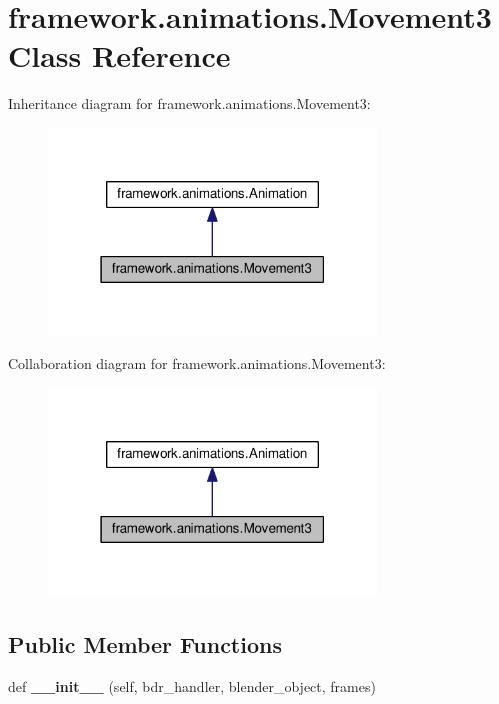 \hypertarget{classframework_1_1animations_1_1Movement3}{}\section{framework.\+animations.\+Movement3 Class Reference}
\label{classframework_1_1animations_1_1Movement3}


Inheritance diagram for framework.\+animations.\+Movement3\+:
\nopagebreak
\begin{figure}[H]
\begin{center}
\leavevmode
\includegraphics[width=247pt]{classframework_1_1animations_1_1Movement3__inherit__graph}
\end{center}
\end{figure}


Collaboration diagram for framework.\+animations.\+Movement3\+:
\nopagebreak
\begin{figure}[H]
\begin{center}
\leavevmode
\includegraphics[width=247pt]{classframework_1_1animations_1_1Movement3__coll__graph}
\end{center}
\end{figure}
\subsection*{Public Member Functions}
\begin{DoxyCompactItemize}
\item 
def {\bfseries \+\_\+\+\_\+init\+\_\+\+\_\+} (self, bdr\+\_\+handler, blender\+\_\+object, frames)\hypertarget{classframework_1_1animations_1_1Movement3_ac45cdb928da0fa179c3465bc3225fbf3}{}\label{classframework_1_1animations_1_1Movement3_ac45cdb928da0fa179c3465bc3225fbf3}

\end{DoxyCompactItemize}
